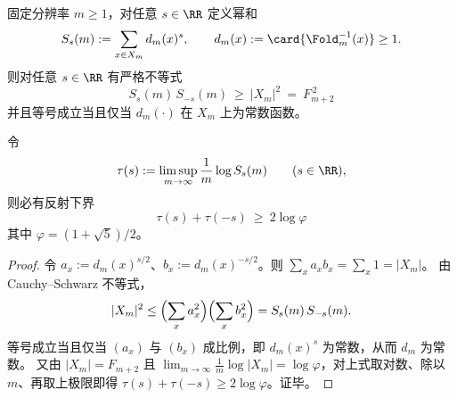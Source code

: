 \begin{proposition}\label{prop:pom-pressure-reflection-inequality}
固定分辨率 \(m\ge 1\)，对任意 \(s\in\RR\) 定义幂和
\[
S_s(m):=\sum_{x\in X_m} d_m(x)^s,
\qquad d_m(x):=\card{\Fold_m^{-1}(x)}\ge 1.
\]
则对任意 \(s\in\RR\) 有严格不等式
\[
\boxed{\;
S_s(m)\,S_{-s}(m)\ \ge\ |X_m|^2\ =\ F_{m+2}^{\,2}\;}
\]
并且等号成立当且仅当 \(d_m(\cdot)\) 在 \(X_m\) 上为常数函数。
\par
令
\[
\tau(s):=\limsup_{m\to\infty}\frac{1}{m}\log S_s(m)\qquad(s\in\RR),
\]
则必有反射下界
\[
\boxed{\;
\tau(s)+\tau(-s)\ \ge\ 2\log\varphi\;}
\]
其中 \(\varphi=(1+\sqrt5)/2\)。
\end{proposition}
\begin{proof}
令 \(a_x:=d_m(x)^{s/2}\)、\(b_x:=d_m(x)^{-s/2}\)。则 \(\sum_x a_xb_x=\sum_x 1=|X_m|\)。
由 Cauchy--Schwarz 不等式，
\[
|X_m|^2\le \Bigl(\sum_x a_x^2\Bigr)\Bigl(\sum_x b_x^2\Bigr)=S_s(m)\,S_{-s}(m).
\]
等号成立当且仅当 \((a_x)\) 与 \((b_x)\) 成比例，即 \(d_m(x)^s\) 为常数，从而 \(d_m\) 为常数。
又由 \(|X_m|=F_{m+2}\) 且 \(\lim_{m\to\infty}\frac{1}{m}\log|X_m|=\log\varphi\)，对上式取对数、除以 \(m\)、再取上极限即得 \(\tau(s)+\tau(-s)\ge 2\log\varphi\)。证毕。
\end{proof}

\endinput
